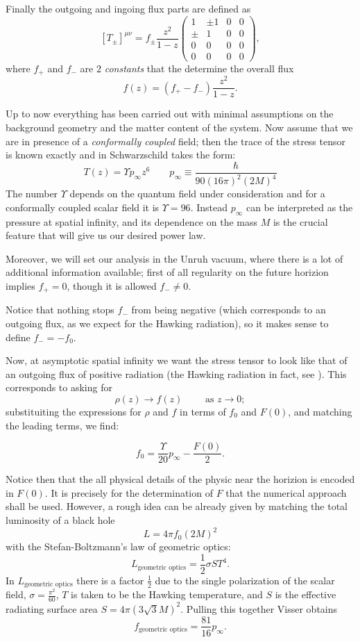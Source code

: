 Finally the outgoing and ingoing flux parts are defined as 
\[
    \left[T_{\pm}\right]^{\mu\nu} = f_{\pm} \frac{z^2}{1 - z}
    \begin{pmatrix}
        1 & \pm 1 & 0 & 0 \\
        \pm & 1 & 0 & 0 \\
        0 & 0 & 0 & 0 \\
        0 & 0 & 0 & 0
    \end{pmatrix},
\]
where \(f_+\) and \(f_-\) are \(2\) \emph{constants} that the determine the overall flux 
\[
f(z) = \left(f_+ - f_-\right) \frac{z^2}{1 - z}. 
\]

Up to now everything has been carried out with minimal assumptions on the background geometry and the matter content of the system. Now assume that we are in presence of a \emph{conformally coupled} field; then the trace of the stress tensor is known exactly and in Schwarzschild takes the form:
\[
T(z) = \Upsilon p_{\infty}z^6 \quad \quad p_{\infty} \equiv \frac{\hbar}{90(16\pi)^2(2M)^4}   
\]
The number \(\Upsilon\) depends on the quantum field under consideration and for a conformally coupled scalar field it is \(\Upsilon = 96\). Instead \(p_{\infty}\) can be interpreted as the pressure at spatial infinity, and its dependence on the mass \(M\) is the crucial feature that will give us our desired power law.

Moreover, we will set our analysis in the Unruh vacuum, where there is a lot of additional information available; first of all regularity on the future horizion implies \(f_+ = 0\), though it is allowed \(f_- \neq 0\).

Notice that nothing stops \(f_-\) from being negative (which corresponds to an outgoing flux, as we expect for the Hawking radiation), so it makes sense to define \(f_- = -f_0\). 

Now, at asymptotic spatial infinity we want the stress tensor to look like that of an outgoing flux of positive radiation (the Hawking radiation in fact, see \cite[]{christensen1977trace}). This corresponds to asking for
\[
\rho(z) \rightarrow f(z) \quad\quad \text{ as } z \rightarrow 0;    
\]
substituiting the expressions for \(\rho\) and \(f\) in terms of \(f_0\) and \(F(0)\), and matching the leading terms, we find:

\[
f_0 = \frac{\Upsilon}{20}p_{\infty} - \frac{F(0)}{2}.
\]

Notice then that the all physical details of the physic near the horizion is encoded in \(F(0)\). It is precisely for the determination of \(F\) that the numerical approach shall be used. However, a rough idea can be already given by matching the total luminosity of a black hole
\[
    L = 4\pi f_0(2M)^2
\]
with the Stefan-Boltzmann's law of geometric optics:
\[
L_{\text{geometric optics}} = \frac{1}{2}\sigma S T^4.  
\]
In \(L_{\text{geometric optics}}\) there is a factor \(\frac{1}{2}\) due to the single polarization of the scalar field, \(\sigma = \frac{\pi^2}{60}\), \(T\) is taken to be the Hawking temperature, and \(S\) is the effective radiating surface area \(S = 4\pi(3\sqrt{3}M)^2\). Pulling this together Visser obtains
\[
 f_{\text{geometric optics}} = \frac{81}{16}p_{\infty}.
\]

